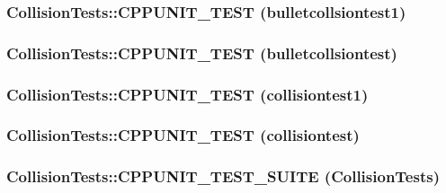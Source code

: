\label{classCollisionTests_a787429e5b0361daacf1df123560ca7c5}
\hypertarget{classCollisionTests_a71fe8a9d6ecb756ffc41dc8cce239944}{
\subsubsection[{CPPUNIT\_\-TEST}]{\setlength{\rightskip}{0pt plus 5cm}CollisionTests::CPPUNIT\_\-TEST (bulletcollsiontest1)}}
\label{classCollisionTests_a71fe8a9d6ecb756ffc41dc8cce239944}
\hypertarget{classCollisionTests_a516a73cfbac5616bd64518c97b922fb8}{
\subsubsection[{CPPUNIT\_\-TEST}]{\setlength{\rightskip}{0pt plus 5cm}CollisionTests::CPPUNIT\_\-TEST (bulletcollsiontest)}}
\label{classCollisionTests_a516a73cfbac5616bd64518c97b922fb8}
\hypertarget{classCollisionTests_aa582a183125d00737483f6ecf9ba1e81}{
\subsubsection[{CPPUNIT\_\-TEST}]{\setlength{\rightskip}{0pt plus 5cm}CollisionTests::CPPUNIT\_\-TEST (collisiontest1)}}
\label{classCollisionTests_aa582a183125d00737483f6ecf9ba1e81}
\hypertarget{classCollisionTests_a6f2e114f6c020b7650a9357386a85084}{
\subsubsection[{CPPUNIT\_\-TEST}]{\setlength{\rightskip}{0pt plus 5cm}CollisionTests::CPPUNIT\_\-TEST (collisiontest)}}
\label{classCollisionTests_a6f2e114f6c020b7650a9357386a85084}
\hypertarget{classCollisionTests_a542155fcf2acb7a46506e5924f32de86}{
\subsubsection[{CPPUNIT\_\-TEST\_\-SUITE}]{\setlength{\rightskip}{0pt plus 5cm}CollisionTests::CPPUNIT\_\-TEST\_\-SUITE ({\bf CollisionTests})}}
